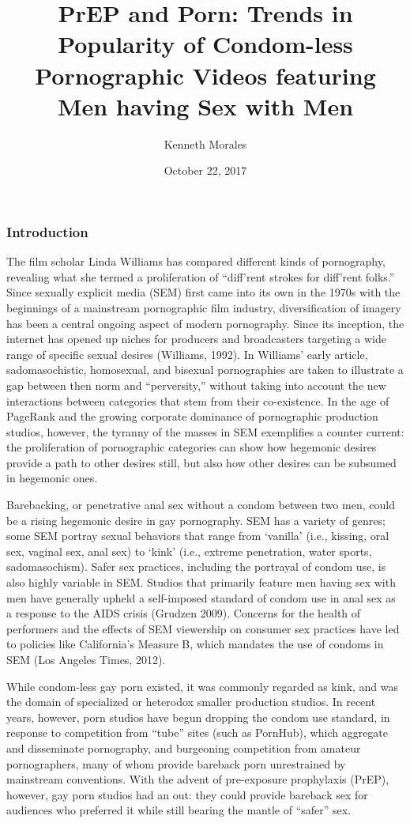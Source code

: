 \documentclass[]{article}
\title{PrEP and Porn: Trends in Popularity of Condom-less Pornographic Videos
featuring Men having Sex with Men}
\author{Kenneth Morales}
\date{October 22, 2017}
\begin{document}
\maketitle

{
\setcounter{tocdepth}{2}
\tableofcontents
}
\subsubsection{Introduction}\label{introduction}

The film scholar Linda Williams has compared different kinds of
pornography, revealing what she termed a proliferation of ``diff'rent
strokes for diff'rent folks.'' Since sexually explicit media (SEM) first
came into its own in the 1970s with the beginnings of a mainstream
pornographic film industry, diversification of imagery has been a
central ongoing aspect of modern pornography. Since its inception, the
internet has opened up niches for producers and broadcasters targeting a
wide range of specific sexual desires (Williams, 1992). In Williams'
early article, sadomasochistic, homosexual, and bisexual pornographies
are taken to illustrate a gap between then norm and ``perversity,''
without taking into account the new interactions between categories that
stem from their co-existence. In the age of PageRank and the growing
corporate dominance of pornographic production studios, however, the
tyranny of the masses in SEM exemplifies a counter current: the
proliferation of pornographic categories can show how hegemonic desires
provide a path to other desires still, but also how other desires can be
subsumed in hegemonic ones.

Barebacking, or penetrative anal sex without a condom between two men,
could be a rising hegemonic desire in gay pornography. SEM has a variety
of genres; some SEM portray sexual behaviors that range from `vanilla'
(i.e., kissing, oral sex, vaginal sex, anal sex) to `kink' (i.e.,
extreme penetration, water sports, sadomasochism). Safer sex practices,
including the portrayal of condom use, is also highly variable in SEM.
Studios that primarily feature men having sex with men have generally
upheld a self-imposed standard of condom use in anal sex as a response
to the AIDS crisis (Grudzen 2009). Concerns for the health of performers
and the effects of SEM viewership on consumer sex practices have led to
policies like California's Measure B, which mandates the use of condoms
in SEM (Los Angeles Times, 2012).

While condom-less gay porn existed, it was commonly regarded as kink,
and was the domain of specialized or heterodox smaller production
studios. In recent years, however, porn studios have begun dropping the
condom use standard, in response to competition from ``tube'' sites
(such as PornHub), which aggregate and disseminate pornography, and
burgeoning competition from amateur pornographers, many of whom provide
bareback porn unrestrained by mainstream conventions. With the advent of
pre-exposure prophylaxis (PrEP), however, gay porn studios had an out:
they could provide bareback sex for audiences who preferred it while
still bearing the mantle of ``safer'' sex.
\end{document}
